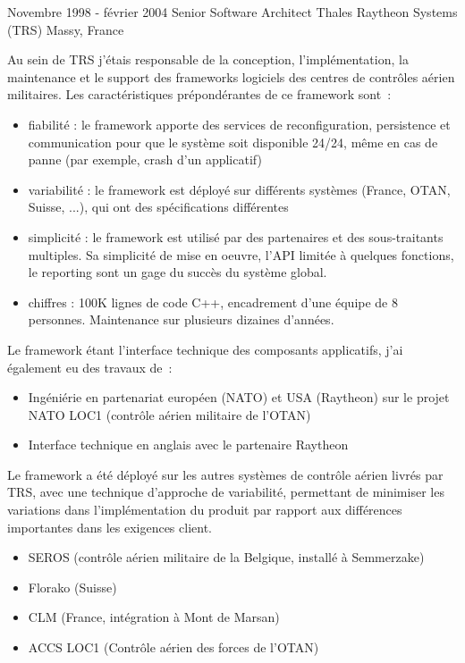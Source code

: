 \item{
\cventrylc
{Novembre 1998 - février 2004} %
{Senior Software Architect} %
{Thales Raytheon Systems (TRS)} %
{Massy, France} %
{}
{ %
Au sein de TRS j'étais responsable de la conception, l'implémentation, la maintenance et le support des frameworks logiciels des centres de contrôles aérien militaires. Les caractéristiques prépondérantes de ce framework sont~:
\begin{itemize}
\item{fiabilité : le framework apporte des services de reconfiguration, persistence et communication pour que le système soit disponible 24/24, même en cas de panne (par exemple, crash d'un applicatif) }
\item{variabilité : le framework est déployé sur différents systèmes (France, OTAN, Suisse, ...), qui ont des spécifications différentes}
\item{simplicité : le framework est utilisé par des partenaires et des sous-traitants multiples. Sa simplicité de mise en oeuvre, l'API limitée à quelques fonctions, le reporting sont un gage du succès du système global.}
\item{chiffres : 100K lignes de code C++, encadrement d'une équipe de 8 personnes. Maintenance sur plusieurs dizaines d'années.}
\end{itemize}
Le framework étant l'interface technique des composants applicatifs, j'ai également eu des travaux de~:
\begin{itemize}
\item {Ingéniérie en partenariat européen (NATO) et USA (Raytheon) sur le projet NATO LOC1 (contrôle aérien militaire de l'OTAN)}
\item {Interface technique en anglais avec le partenaire Raytheon}
\end{itemize}
Le framework a été déployé sur les autres systèmes de contrôle aérien livrés par TRS, avec une technique d'approche de variabilité, permettant de minimiser les variations dans l'implémentation du produit par rapport aux différences importantes dans les exigences client.
 \begin{itemize}
 \item SEROS (contrôle aérien militaire de la Belgique, installé à Semmerzake)
 \item Florako (Suisse)
 \item CLM (France, intégration à Mont de Marsan)
 \item ACCS LOC1 (Contrôle aérien des forces de l'OTAN)
 \end{itemize}
}
}